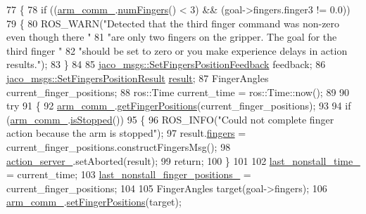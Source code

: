 \begin{DoxyCode}
77 \{
78     \textcolor{keywordflow}{if} ((\hyperlink{classjaco_1_1JacoFingersActionServer_afbddf1665a5e66b79cc79cae0b2badeb}{arm\_comm\_}.\hyperlink{classjaco_1_1JacoComm_a42e11ee165ee8f2b1af7e7060f488ce1}{numFingers}() < 3) && (goal->fingers.finger3 != 0.0))
79     \{
80         ROS\_WARN(\textcolor{stringliteral}{"Detected that the third finger command was non-zero even though there "}
81                  \textcolor{stringliteral}{"are only two fingers on the gripper. The goal for the third finger "}
82                  \textcolor{stringliteral}{"should be set to zero or you make experience delays in action results."});
83     \}
84 
85     \hyperlink{structjaco__msgs_1_1SetFingersPositionFeedback__}{jaco\_msgs::SetFingersPositionFeedback} feedback;
86     \hyperlink{structjaco__msgs_1_1SetFingersPositionResult__}{jaco\_msgs::SetFingersPositionResult} 
      \hyperlink{Kinova_8API_8CommLayerUbuntu_8h_a900dac90961bada00f57c207562a6a9a}{result};
87     FingerAngles current\_finger\_positions;
88     ros::Time current\_time = ros::Time::now();
89 
90     \textcolor{keywordflow}{try}
91     \{
92         \hyperlink{classjaco_1_1JacoFingersActionServer_afbddf1665a5e66b79cc79cae0b2badeb}{arm\_comm\_}.\hyperlink{classjaco_1_1JacoComm_a7644bf1154b59bf4d8b97c200284e3fb}{getFingerPositions}(current\_finger\_positions);
93 
94         \textcolor{keywordflow}{if} (\hyperlink{classjaco_1_1JacoFingersActionServer_afbddf1665a5e66b79cc79cae0b2badeb}{arm\_comm\_}.\hyperlink{classjaco_1_1JacoComm_a872b8033cda5a9fe4ccdca2e89aa03d1}{isStopped}())
95         \{
96             ROS\_INFO(\textcolor{stringliteral}{"Could not complete finger action because the arm is stopped"});
97             result.\hyperlink{structjaco__msgs_1_1SetFingersPositionResult___a5c4ac8ab3df0087e2ea584f4b419e91a}{fingers} = current\_finger\_positions.constructFingersMsg();
98             \hyperlink{classjaco_1_1JacoFingersActionServer_a34f6a67ccd8fe1ad2bc75873d20da0f1}{action\_server\_}.setAborted(result);
99             \textcolor{keywordflow}{return};
100         \}
101 
102         \hyperlink{classjaco_1_1JacoFingersActionServer_ad9ee1e4c978970bdfac066f6dc9c4316}{last\_nonstall\_time\_} = current\_time;
103         \hyperlink{classjaco_1_1JacoFingersActionServer_a77586bea5c075f6439f6dc3858513e46}{last\_nonstall\_finger\_positions\_} = current\_finger\_positions;
104 
105         FingerAngles target(goal->fingers);
106         \hyperlink{classjaco_1_1JacoFingersActionServer_afbddf1665a5e66b79cc79cae0b2badeb}{arm\_comm\_}.\hyperlink{classjaco_1_1JacoComm_a5cdc217373b923f7de2ed468150281fa}{setFingerPositions}(target);

\end{DoxyCode}
